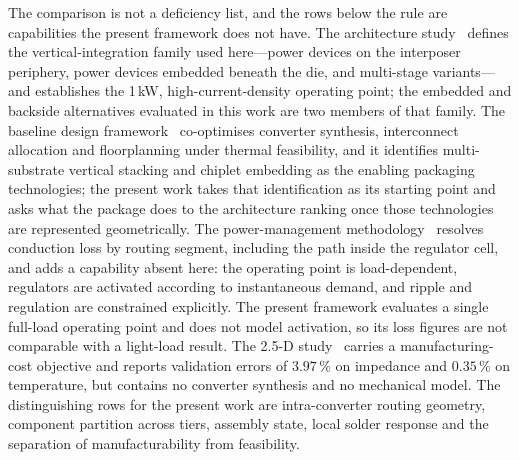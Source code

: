 \documentclass[journal]{IEEEtran}
\begin{document}
The comparison is not a deficiency list, and the rows below the rule are capabilities the
present framework does not have. The architecture study~\cite{VPD2023Architectures} defines
the vertical-integration family used here---power devices on the interposer periphery, power
devices embedded beneath the die, and multi-stage variants---and establishes the 1\,kW,
high-current-density operating point; the embedded and backside alternatives evaluated in
this work are two members of that family. The baseline design
framework~\cite{Krishnakumar2026DVPD} co-optimises converter synthesis, interconnect
allocation and floorplanning under thermal feasibility, and it identifies multi-substrate
vertical stacking and chiplet embedding as the enabling packaging technologies; the present
work takes that identification as its starting point and asks what the package does to the
architecture ranking once those technologies are represented geometrically. The power-management
methodology~\cite{DVPD2026PowerMgmt} resolves conduction loss by routing segment, including
the path inside the regulator cell, and adds a capability absent here: the operating point is
load-dependent, regulators are activated according to instantaneous demand, and ripple and
regulation are constrained explicitly. The present framework evaluates a single full-load
operating point and does not model activation, so its loss figures are not comparable with a
light-load result. The 2.5-D study~\cite{Wang2025TTSV} carries a manufacturing-cost objective
and reports validation errors of $3.97$\,\% on impedance and $0.35$\,\% on temperature, but
contains no converter synthesis and no mechanical model. The distinguishing rows for the
present work are intra-converter routing geometry, component partition across tiers, assembly
state, local solder response and the separation of manufacturability from feasibility.
\end{document}
